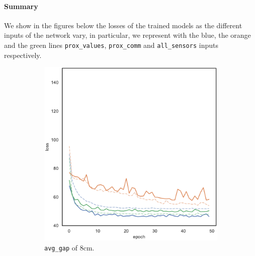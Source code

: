 \paragraph*{Summary}
We show in the figures below the losses of the trained models as the different 
inputs of the network vary, in particular, we represent with the blue, the orange 
and the green lines \texttt{prox\_values}, \texttt{prox\_comm} and
\texttt{all\_sensors} inputs respectively.
\begin{figure}[!htb]
	\centering
	\begin{subfigure}[h]{0.3\textwidth}
		\centering
		\includegraphics[width=\textwidth]{contents/images/task1/loss-distributed-gap_8@copy}%
		\caption{\texttt{avg\_gap} of $8$cm.}
	\end{subfigure}
	\hfill
	\begin{subfigure}[h]{0.3\textwidth}
		\centering

\end{subfigure}
\end{figure}
